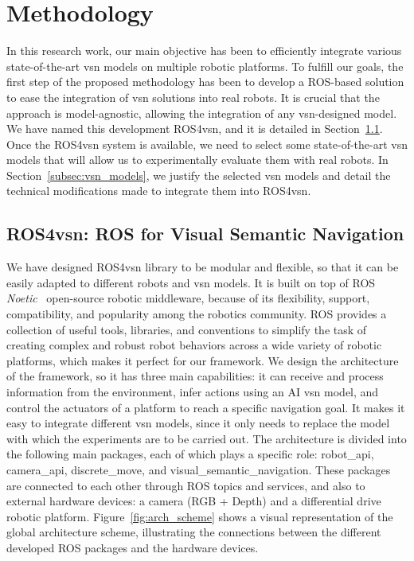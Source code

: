 \section{Methodology}\label{sec:methodology}
In this research work, our main objective has been to efficiently integrate various state-of-the-art \acrshort{vsn} models on multiple robotic platforms.
To fulfill our goals, the first step of the proposed methodology has been to develop a ROS-based solution to ease the integration of \acrshort{vsn} solutions into real robots.
It is crucial that the approach is model-agnostic, allowing the integration of any \acrshort{vsn}-designed model.
We have named this development ROS4\acrshort{vsn}, and it is detailed in Section~\ref{subsec:ros4vsn}.
Once the ROS4\acrshort{vsn} system is available, we need to select some state-of-the-art \acrshort{vsn} models that will allow us to experimentally evaluate them with real robots.
In Section~\ref{subsec:vsn_models}, we justify the selected \acrshort{vsn} models and detail the technical modifications made to integrate them into ROS4\acrshort{vsn}\@.


\subsection{ROS4\acrshort{vsn}: ROS for Visual Semantic Navigation}
\label{subsec:ros4vsn}

We have designed ROS4\acrshort{vsn} library to be modular and flexible, so that it can be easily adapted to different robots and \acrshort{vsn} models.
It is built on top of ROS \textit{Noetic}~\cite{ros} open-source robotic middleware, because of its flexibility, support, compatibility, and popularity among the robotics community.
ROS provides a collection of useful tools, libraries, and conventions to simplify the task of creating complex and robust robot behaviors across a wide variety of robotic platforms, which makes it perfect for our framework.
We design the architecture of the framework, so it has three main capabilities: it can receive and process information from the environment, infer actions using an AI \acrshort{vsn} model, and control the actuators of a platform to reach a specific navigation goal.
It makes it easy to integrate different \acrshort{vsn} models, since it only needs to replace the model with which the experiments are to be carried out.
The architecture is divided into the following main packages, each of which plays a specific role: robot\_api, camera\_api, discrete\_move, and visual\_semantic\_navigation.
These packages are connected to each other through ROS topics and services, and also to external hardware devices: a camera (RGB + Depth) and a differential drive robotic platform.
Figure~\ref{fig:arch_scheme} shows a visual representation of the global architecture scheme, illustrating the connections between the different developed ROS packages and the hardware devices.

